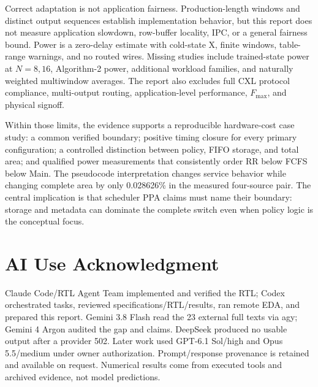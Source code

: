 Correct adaptation is not application fairness. Production-length windows and distinct output sequences establish implementation behavior, but this report does not measure application slowdown, row-buffer locality, IPC, or a general fairness bound. Power is a zero-delay estimate with cold-state X, finite windows, table-range warnings, and no routed wires. Missing studies include trained-state power at $N=8,16$, Algorithm-2 power, additional workload families, and naturally weighted multiwindow averages. The report also excludes full CXL protocol compliance, multi-output routing, application-level performance, $F_{\max}$, and physical signoff.

Within those limits, the evidence supports a reproducible hardware-cost case study: a common verified boundary; positive timing closure for every primary configuration; a controlled distinction between policy, FIFO storage, and total area; and qualified power measurements that consistently order RR below FCFS below Main. The pseudocode interpretation changes service behavior while changing complete area by only 0.028626\% in the measured four-source pair. The central implication is that scheduler PPA claims must name their boundary: storage and metadata can dominate the complete switch even when policy logic is the conceptual focus.

\section{AI Use Acknowledgment}
Claude Code/RTL Agent Team implemented and verified the RTL; Codex orchestrated tasks, reviewed specifications/RTL/results, ran remote EDA, and prepared this report. Gemini 3.8 Flash read the 23 external full texts via agy; Gemini 4 Argon audited the gap and claims. DeepSeek produced no usable output after a provider 502. Later work used GPT-6.1 Sol/high and Opus 5.5/medium under owner authorization. Prompt/response provenance is retained and available on request. Numerical results come from executed tools and archived evidence, not model predictions.
